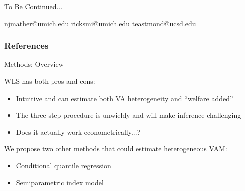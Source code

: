 \documentclass[t,aspectratio=169,11pt]{beamer}
\newenvironment{wideitemize}{\itemize\addtolength{\itemsep}{14pt}}{\enditemize}
\begin{document}


\begin{frame}[c,noframenumbering]
\centering
\Huge{\centerline{To Be Continued...}}
\normalsize njmather{\selectfont @}umich.edu \hspace{2em}
ricksmi{\selectfont @}umich.edu \hspace{2em} \normalsize teastmond{\selectfont @}ucsd.edu
\end{frame}



\begin{frame}[noframenumbering]
\frametitle{References}
\tiny

\end{frame}



\appendix




\begin{frame}[label=methods]{Methods: Overview}

\begin{wideitemize}

\item WLS has both pros and cons:
\begin{itemize}
    \item Intuitive and can estimate both VA heterogeneity and ``welfare added'' %
    \item The three-step procedure is unwieldy and will make inference challenging
    \item Does it actually work econometrically...? 
\end{itemize}

\item We propose two other methods that could estimate heterogeneous VAM:
\begin{itemize}
    \item Conditional quantile regression
    \item Semiparametric index model
\end{itemize}

\end{wideitemize}

\end{frame}
\end{document}
